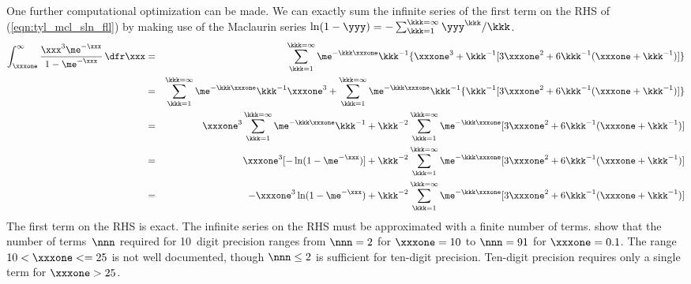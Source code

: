 \documentclass[12pt]{article}
\begin{document}
One further computational optimization can be made.
We can exactly sum the infinite series of the first term on the RHS of (\ref{eqn:tyl_mcl_sln_fll}) by making use of the Maclaurin series 
$\ln(1 - \yyy) = - \sum_{\kkk=1}^{\kkk=\infty} \yyy^{\kkk}/\kkk$.
\begin{eqnarray}
\int_{\xxxone}^{\infty} 
\frac{\xxx^{3}\me^{-\xxx}}{1 - \me^{-\xxx}} \,\dfr\xxx
 & = &
\sum_{\kkk=1}^{\kkk=\infty} \me^{-\kkk\xxxone}\kkk^{-1}\{\xxxone^{3} + \kkk^{-1}[3\xxxone^{2} + 6\kkk^{-1}(\xxxone + \kkk^{-1})]\} \nonumber \\
 & = &
\sum_{\kkk=1}^{\kkk=\infty} \me^{-\kkk\xxxone}\kkk^{-1}\xxxone^{3} + 
\sum_{\kkk=1}^{\kkk=\infty} \me^{-\kkk\xxxone}\kkk^{-1}\{\kkk^{-1}[3\xxxone^{2} + 6\kkk^{-1}(\xxxone + \kkk^{-1})]\} \nonumber \\
 & = &
\xxxone^{3} \sum_{\kkk=1}^{\kkk=\infty} \me^{-\kkk\xxxone}\kkk^{-1} + 
\kkk^{-2}\sum_{\kkk=1}^{\kkk=\infty} \me^{-\kkk\xxxone}[3\xxxone^{2} + 6\kkk^{-1}(\xxxone + \kkk^{-1})] \nonumber \\
 & = &
\xxxone^{3}[-\ln(1 - \me^{-\xxx})] + 
\kkk^{-2}\sum_{\kkk=1}^{\kkk=\infty} \me^{-\kkk\xxxone}[3\xxxone^{2} + 6\kkk^{-1}(\xxxone + \kkk^{-1})] \nonumber \\
 & = &
-\xxxone^{3}\ln(1 - \me^{-\xxx}) + 
\kkk^{-2}\sum_{\kkk=1}^{\kkk=\infty} \me^{-\kkk\xxxone}[3\xxxone^{2} + 6\kkk^{-1}(\xxxone + \kkk^{-1})]
\label{eqn:tyl_mcl_sln_opt}
\end{eqnarray}
The first term on the RHS is exact.
The infinite series on the RHS must be approximated with a finite number of terms.
\cite{WiW76} show that the number of terms~$\nnn$ required for 10~digit precision ranges from $\nnn=2$ for $\xxxone = 10$ to $\nnn=91$ for $\xxxone = 0.1$.
The range $10 < \xxxone <= 25$ is not well documented, though $\nnn \le 2$ is sufficient for ten-digit precision.
Ten-digit precision requires only a single term for $\xxxone > 25$.
\end{document}
